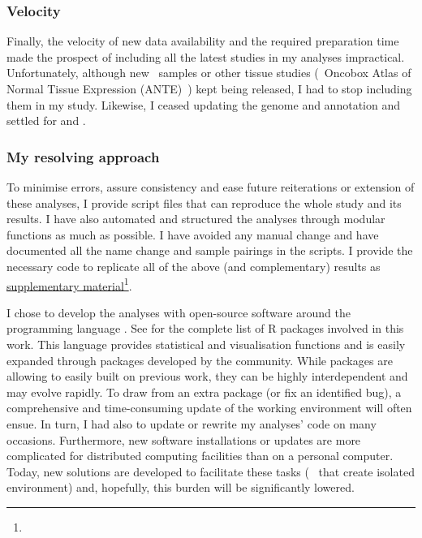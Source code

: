 \subsubsection*{Velocity}
\vspace{-3mm}
Finally, the velocity of new data availability
and the required preparation time
made the prospect of including all the latest studies in my analyses impractical.
Unfortunately, although new \gtex\ samples or other tissue studies
(\eg\ Oncobox Atlas of Normal Tissue Expression (ANTE)~)
kept being released,
I had to stop including them in my study.
Likewise, I ceased updating the genome and annotation
and settled for  and .\mybr\

\subsubsection*{My resolving approach}
\vspace{-3mm}
To minimise errors,
assure consistency and ease future reiterations or extension of these analyses,
I provide script files that can reproduce the whole study and its results.
I have also automated and structured the analyses through modular functions
as much as possible.
I have avoided any manual change and
have documented all the name change and sample pairings in the scripts.
I provide the necessary code to replicate all of the above (and complementary) results
as \href{https://github.com/barzine/BaselineAtlas/tree/thesis.}{supplementary
material}\footnote{}.\mybr\

I chose to develop the analyses with open-source software
around the programming language .
See  for the complete list of \textsf{R} packages
involved in this work.
This language provides statistical and visualisation functions
and is easily expanded through packages developed by the community.
While packages are allowing to easily built on previous work,
they can be highly interdependent and may evolve rapidly.
To draw from an extra package (or fix an identified bug),
a comprehensive and time-consuming update of the working environment
will often ensue.
In turn, I had also to update or rewrite my analyses' code on many occasions.
Furthermore, new software installations or updates are more complicated
for distributed computing facilities than on a personal computer.
Today, new solutions are developed to facilitate these tasks
(\eg\  that create isolated environment)
and, hopefully, this burden will be significantly lowered.\mybr\


